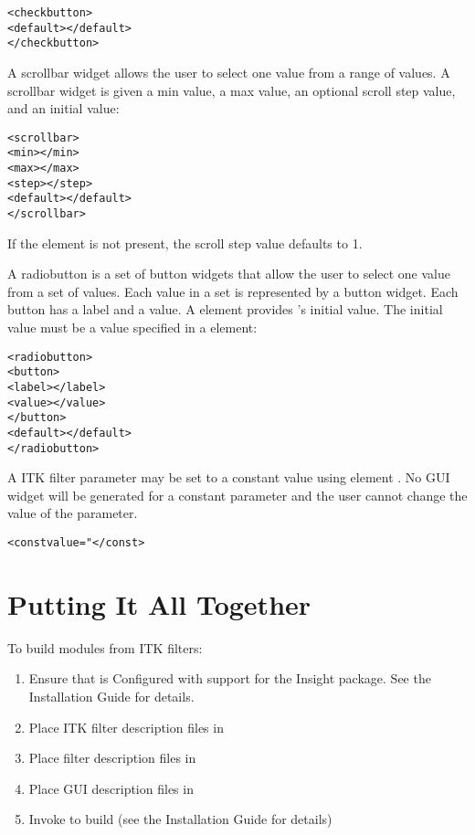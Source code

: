 \begin{alltt}
  <checkbutton>
    <default></default>
  </checkbutton>
\end{alltt}

A scrollbar widget allows the user to select one value from a
range of values.  A scrollbar widget is given a min value, a max
value, an optional scroll step value, and an initial value:

\begin{alltt}
  <scrollbar>
    <min></min>
    <max></max>
    <step></step>
    <default></default>
  </scrollbar>
\end{alltt}

If the  element is not present, the scroll step value
defaults to 1.

A radiobutton is a set of button widgets that allow the user to select
one value from a set of values.  Each value in a set is represented
by a button widget.  Each button has a label and a value.  A
 element provides 's
initial value.  The initial value must be a value specified in a
 element:

\begin{alltt}
  <radiobutton>
    <button>
      <label></label>
      <value></value>
    </button>
    \velide  
    <default></default>
  </radiobutton>
\end{alltt}

A ITK filter parameter may be set to a constant value using element
.  No GUI widget will be generated for a constant
parameter and the user cannot change the value of the parameter.

\begin{alltt}
  <const value="</const>
\end{alltt}

\section{Putting It All Together}
\label{sec:itk_mods:put_together}

To build \sr{} modules from ITK filters:

\begin{enumerate}
\item Ensure that \sr{} is Configured with support for the Insight
  package.  See the \sr{} Installation Guide for details.
\item Place ITK filter description files in
\item Place \sr{} filter description files in
\item Place \sr{} GUI description files in
\item Invoke  to build \sr{} (see the \sr{}
  Installation Guide for details)
\end{enumerate}

